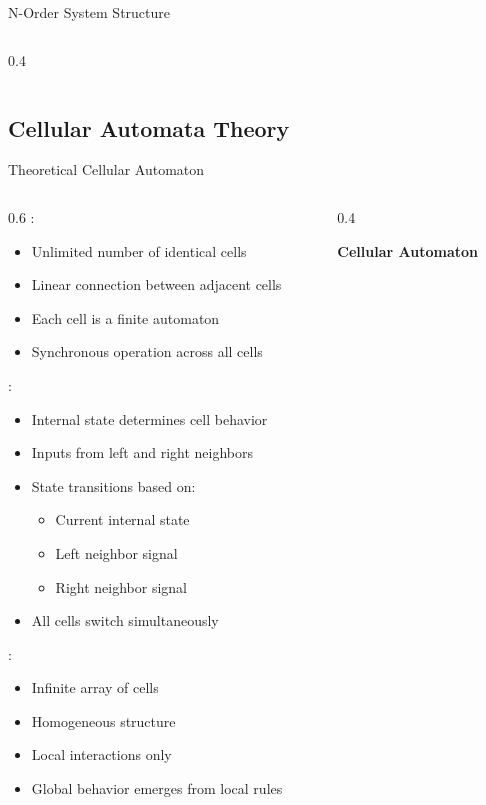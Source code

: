 \begin{frame}{N-Order System Structure}
\begin{columns}
\begin{column}{0.4\textwidth}
\begin{center}
\end{center}
\end{column}
\end{columns}
\end{frame}

\subsection{Cellular Automata Theory}

\begin{frame}{Theoretical Cellular Automaton}
\begin{columns}
\begin{column}{0.6\textwidth}
:
\begin{itemize}
\item Unlimited number of identical cells
\item Linear connection between adjacent cells
\item Each cell is a finite automaton
\item Synchronous operation across all cells
\end{itemize}

\vspace{0.3cm}
:
\begin{itemize}
\item Internal state determines cell behavior
\item Inputs from left and right neighbors
\item State transitions based on:
\begin{itemize}
\item Current internal state
\item Left neighbor signal
\item Right neighbor signal
\end{itemize}
\item All cells switch simultaneously
\end{itemize}

\vspace{0.3cm}
:
\begin{itemize}
\item Infinite array of cells
\item Homogeneous structure
\item Local interactions only
\item Global behavior emerges from local rules
\end{itemize}
\end{column}
\begin{column}{0.4\textwidth}
\begin{center}
\textbf{Cellular Automaton}
\vspace{0.3cm}


\end{center}
\end{column}
\end{columns}
\end{frame}

